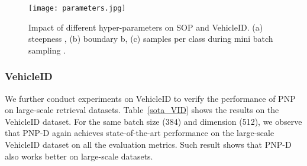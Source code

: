 \begin{table}[t]

\liuhao

\centering




\caption{Evaluation of robustness on {VehicleID} (\%).}
\label{robustness_VID}

\end{table}


\begin{figure}[t]
\centering
\texttt{[image: parameters.jpg]}
\caption{Impact of different hyper-parameters on SOP and VehicleID. (a) steepness , (b) boundary b, (c) samples per class during mini batch sampling . }
\label{parameters}
\end{figure}








\subsubsection*{VehicleID}

\indent\setlength{\parindent}{1em}We further conduct experiments on VehicleID to verify the performance of PNP on large-scale retrieval datasets. Table~\ref{sota_VID} shows the results on the VehicleID dataset. For the same batch size (384) and dimension (512), we observe that PNP-D again achieves state-of-the-art performance on the large-scale VehicleID dataset on all the evaluation metrics. Such result shows that PNP-D also works better on large-scale datasets. 

